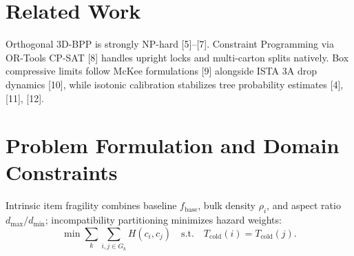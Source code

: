 \documentclass[conference]{IEEEtran}
\begin{document}
\section{Related Work}
Orthogonal 3D-BPP is strongly NP-hard [5]--[7]. Constraint Programming via OR-Tools CP-SAT [8] handles upright locks and multi-carton splits natively. Box compressive limits follow McKee formulations [9] alongside ISTA 3A drop dynamics [10], while isotonic calibration stabilizes tree probability estimates [4], [11], [12].

\section{Problem Formulation and Domain Constraints}
Intrinsic item fragility combines baseline $f_{\text{base}}$, bulk density $\rho_i$, and aspect ratio $d_{\max}/d_{\min}$; incompatibility partitioning minimizes hazard weights:
\begin{equation}
\min \sum_k \sum_{i,j \in G_k} H(c_i, c_j) \quad \text{s.t.} \quad T_{\text{cold}}(i) = T_{\text{cold}}(j).
\end{equation}
\end{document}
